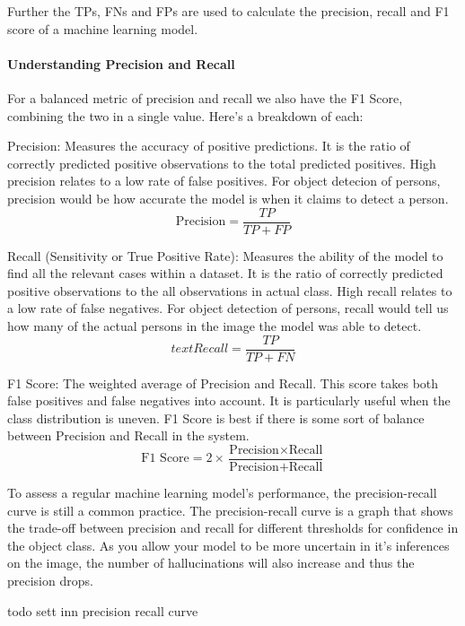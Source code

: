 Further the TPs, FNs and FPs are used to calculate the precision, recall and F1 score of a machine learning model.

\paragraph{Understanding Precision and Recall}
\label{sec:understandingprecision}
For a balanced metric of precision and recall we also have the F1 Score, combining the two in a single value. Here’s a breakdown of each:

Precision: Measures the accuracy of positive predictions. It is the ratio of correctly predicted positive observations to the total predicted positives. High precision relates to a low rate of false positives. For object detecion of persons, precision would be how accurate the model is when it claims to detect a person.
\[
\text{Precision} = \frac{TP}{TP + FP}	
\]

Recall (Sensitivity or True Positive Rate): Measures the ability of the model to find all the relevant cases within a dataset. It is the ratio of correctly predicted positive observations to the all observations in actual class. High recall relates to a low rate of false negatives. For object detection of persons, recall would tell us how many of the actual persons in the image the model was able to detect.
\[
text{Recall} = \frac{TP}{TP + FN}	
\]

F1 Score: The weighted average of Precision and Recall. This score takes both false positives and false negatives into account. It is particularly useful when the class distribution is uneven. F1 Score is best if there is some sort of balance between Precision and Recall in the system.
\[
\text{F1 Score} = 2 \times \frac{\text{Precision} \times \text{Recall}}{\text{Precision} + \text{Recall}}
\]

To assess a regular machine learning model's performance, the precision-recall curve is still a common practice. The precision-recall curve is a graph that shows the trade-off between precision and recall for different thresholds for confidence in the object class. As you allow your model to be more uncertain in it's inferences on the image, the number of hallucinations will also increase and thus the precision drops.

todo sett inn precision recall curve


